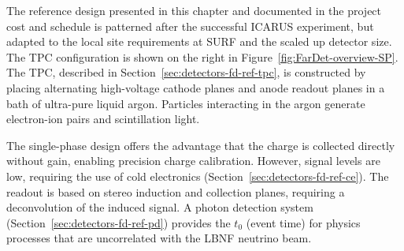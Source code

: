 The reference design presented in this chapter and documented in the
project cost and schedule is patterned after the successful ICARUS
experiment, but adapted to the local site requirements at SURF and the
scaled up detector size.  The TPC configuration is shown on the right
in Figure~\ref{fig:FarDet-overview-SP}.  The TPC, described in
Section~\ref{sec:detectors-fd-ref-tpc}, is constructed by placing
alternating high-voltage cathode planes and anode readout planes in a
bath of ultra-pure liquid argon. Particles interacting in the argon
generate electron-ion pairs and scintillation light.

The single-phase design offers the advantage that the charge is
collected directly without gain, enabling precision charge
calibration. However, signal levels are low, requiring the use of cold
electronics (Section~\ref{sec:detectors-fd-ref-ce}). The readout is
based on stereo induction and collection planes, requiring a
deconvolution of the induced signal. A photon detection system
(Section~\ref{sec:detectors-fd-ref-pd}) provides the $t_0$ (event
time) for physics processes that are uncorrelated with the LBNF
neutrino beam.
